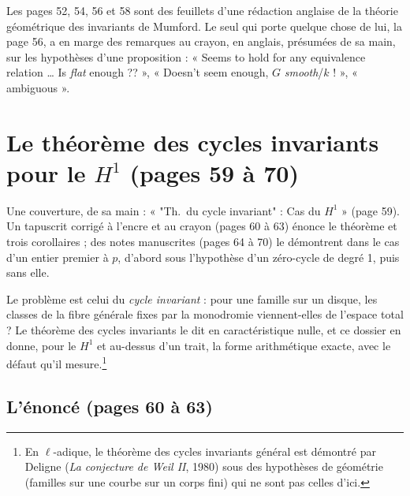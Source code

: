 \documentclass[11pt,a4paper]{article}
\begin{document}
Les pages 52, 54, 56 et 58 sont des feuillets d'une rédaction anglaise de la
théorie géométrique des invariants de Mumford. Le seul qui porte quelque chose de
lui, la page 56, a en marge des remarques au crayon, en anglais, présumées de sa
main, sur les hypothèses d'une proposition : « Seems to hold for any equivalence
relation \ldots{} Is \emph{flat} enough ?? », « Doesn't seem enough, $G$
\emph{smooth}/$k$ ! », « ambiguous ».

\section*{Le théorème des cycles invariants pour le $H^1$ (pages 59 à 70)}

Une couverture, de sa main : « "Th.\ du cycle invariant" : Cas du $H^1$ » (page
59). Un tapuscrit corrigé à l'encre et au crayon (pages 60 à 63) énonce le
théorème et trois corollaires ; des notes manuscrites (pages 64 à 70) le
démontrent dans le cas d'un entier premier à $p$, d'abord sous l'hypothèse d'un
zéro-cycle de degré 1, puis sans elle.

Le problème est celui du \emph{cycle invariant} : pour une famille sur un disque,
les classes de la fibre générale fixes par la monodromie viennent-elles de
l'espace total ? Le théorème des cycles invariants le dit en caractéristique
nulle, et ce dossier en donne, pour le $H^1$ et au-dessus d'un trait, la forme
arithmétique exacte, avec le défaut qu'il mesure.\footnote{En $\ell$-adique, le
théorème des cycles invariants général est démontré par Deligne
(\emph{La conjecture de Weil II}, 1980) sous des hypothèses de géométrie
(familles sur une courbe sur un corps fini) qui ne sont pas celles d'ici.}

\subsection*{L'énoncé (pages 60 à 63)}
\end{document}
